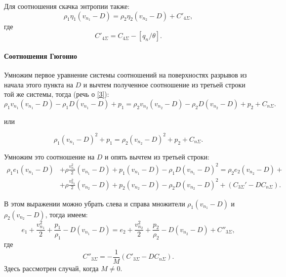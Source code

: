 Для соотношения скачка энтропии также:
\begin{equation*}
	\rho_1 \eta_1 \left(v_{n_1} - D\right) = \rho_2 \eta_2 \left(v_{n_2} - D\right) + C'_{4\Sigma},
\end{equation*}
где
\begin{equation*}
	C'_{4\Sigma} = C_{4\Sigma} - [q_{n}/\theta].
\end{equation*}

\paragraph{Соотношения Гюгонио}

Умножим первое уравнение системы соотношений на поверхностях разрывов из начала этого пункта на $D$ и вычтем полученное соотношение из третьей строки той же системы, тогда (речь о \ref{3}):
\begin{equation*}
	\rho_1 v_{n_1} \left(v_{n_1} - D\right) - \rho_1 D \left(v_{n_1} - D\right) + p_1 = \rho_2 v_{n_2} (v_{n_2} - D) - \rho_2 D \left(v_{n_2} - D\right) + p_2 + C_{n\Sigma}.
\end{equation*} 

или

\begin{equation*}
	\rho_1 \left(v_{n_1} - D\right)^2 + p_1 = \rho_2 \left(v_{n_2} - D\right)^2 + p_2 + C_{n\Sigma}.
\end{equation*}

Умножим это соотношение на $D$ и опять вычтем из третьей строки:
\begin{align*}
	\rho_1 e_1 \left(v_{n_1} - D\right) &+ \rho \frac{v_{n_1}^2}{2} \left(v_{n_1} - D\right) + p_1(v_{n_1} - D) - \rho_1 D \left(v_{n_1} - D\right)^2 = \rho_2 e_2 (v_{n_2} - D) + \\
	&+ \rho \frac{v^2_{n_2}}{2} \left(v_{n_2} - D\right) + p_2 \left(v_{n_2} - D\right) - \rho_2 D \left(v_{n_2} - D\right)^2 + \left(C_{3\Sigma}' - D C_{n\Sigma}\right).
\end{align*}

В этом выражении можно убрать слева и справа множители $\rho_1 \left(v_{n_1} - D\right)$ и $\rho_2 \left(v_{n_2} - D\right)$, тогда имеем:
\begin{equation*}
	e_1 + \frac{v^2_{n_1}}{2} + \frac{p_1}{\rho_1} - D \left(v_{n_1} - D\right) = e_2 + \frac{v^2_{n_2}}{2} + \frac{p_2}{\rho_2} - D \left(v_{n_2} - D\right) + C''_{3\Sigma},
\end{equation*}
где 
\begin{equation*}
	C''_{3\Sigma} = - \frac{1}{M} \left(C'_{3\Sigma} - D C_{n\Sigma}\right).
\end{equation*}
Здесь рассмотрен случай, когда $M \not = 0$.

